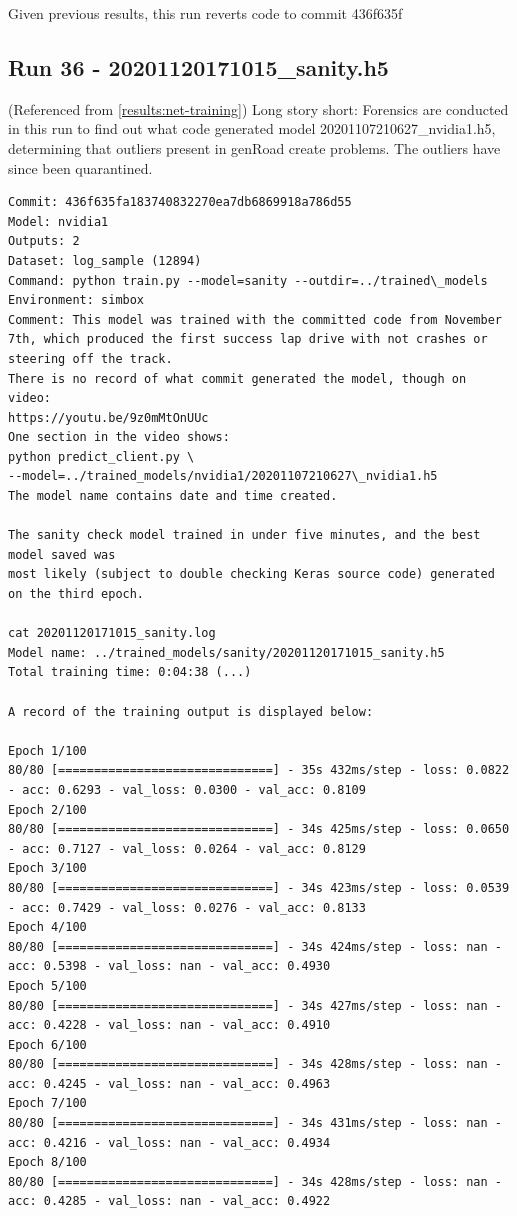 Given previous results, this run reverts code to commit 436f635f

\subsection{Run 36 - 20201120171015\_sanity.h5}
(Referenced from \ref{results:net-training})
Long story short: Forensics are conducted in this run to find out what code generated model 
20201107210627\_nvidia1.h5, determining that outliers present in genRoad create problems. The outliers have since been quarantined.

\label{app_res:36}

\begin{verbatim}
Commit: 436f635fa183740832270ea7db6869918a786d55
Model: nvidia1
Outputs: 2
Dataset: log_sample (12894) 
Command: python train.py --model=sanity --outdir=../trained\_models
Environment: simbox
Comment: This model was trained with the committed code from November 7th, which produced the first success lap drive with not crashes or steering off the track.
There is no record of what commit generated the model, though on video:
https://youtu.be/9z0mMtOnUUc
One section in the video shows:
python predict_client.py \
--model=../trained_models/nvidia1/20201107210627\_nvidia1.h5
The model name contains date and time created.

The sanity check model trained in under five minutes, and the best model saved was
most likely (subject to double checking Keras source code) generated on the third epoch.

cat 20201120171015_sanity.log
Model name: ../trained_models/sanity/20201120171015_sanity.h5
Total training time: 0:04:38 (...)

A record of the training output is displayed below:

Epoch 1/100
80/80 [==============================] - 35s 432ms/step - loss: 0.0822 - acc: 0.6293 - val_loss: 0.0300 - val_acc: 0.8109
Epoch 2/100
80/80 [==============================] - 34s 425ms/step - loss: 0.0650 - acc: 0.7127 - val_loss: 0.0264 - val_acc: 0.8129
Epoch 3/100
80/80 [==============================] - 34s 423ms/step - loss: 0.0539 - acc: 0.7429 - val_loss: 0.0276 - val_acc: 0.8133
Epoch 4/100
80/80 [==============================] - 34s 424ms/step - loss: nan - acc: 0.5398 - val_loss: nan - val_acc: 0.4930
Epoch 5/100
80/80 [==============================] - 34s 427ms/step - loss: nan - acc: 0.4228 - val_loss: nan - val_acc: 0.4910
Epoch 6/100
80/80 [==============================] - 34s 428ms/step - loss: nan - acc: 0.4245 - val_loss: nan - val_acc: 0.4963
Epoch 7/100
80/80 [==============================] - 34s 431ms/step - loss: nan - acc: 0.4216 - val_loss: nan - val_acc: 0.4934
Epoch 8/100
80/80 [==============================] - 34s 428ms/step - loss: nan - acc: 0.4285 - val_loss: nan - val_acc: 0.4922


\end{verbatim}
